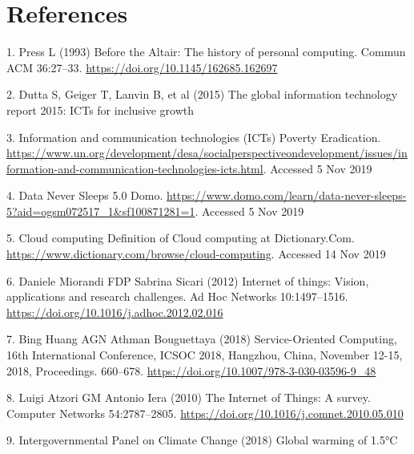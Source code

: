 \documentclass[11pt,]{article}
\begin{document}
\hypertarget{references}{%
\section*{References}\label{references}}

\hypertarget{refs}{}
\leavevmode\hypertarget{ref-pressAltairHistoryPersonal1993}{}%
1. Press L (1993) Before the Altair: The history of personal computing.
Commun ACM 36:27--33. \url{https://doi.org/10.1145/162685.162697}

\leavevmode\hypertarget{ref-duttaGlobalInformationTechnology2015}{}%
2. Dutta S, Geiger T, Lanvin B, et al (2015) The global information
technology report 2015: ICTs for inclusive growth

\leavevmode\hypertarget{ref-InformationCommunicationTechnologies}{}%
3. Information and communication technologies (ICTs) \textbar{} Poverty
Eradication.
\url{https://www.un.org/development/desa/socialperspectiveondevelopment/issues/information-and-communication-technologies-icts.html}.
Accessed 5 Nov 2019

\leavevmode\hypertarget{ref-DataNeverSleeps}{}%
4. Data Never Sleeps 5.0 \textbar{} Domo.
\url{https://www.domo.com/learn/data-never-sleeps-5?aid=ogsm072517_1\&sf100871281=1}.
Accessed 5 Nov 2019

\leavevmode\hypertarget{ref-CloudComputingDefinition}{}%
5. Cloud computing \textbar{} Definition of Cloud computing at
Dictionary.Com. \url{https://www.dictionary.com/browse/cloud-computing}.
Accessed 14 Nov 2019

\leavevmode\hypertarget{ref-danielemiorandiInternetThingsVision2012}{}%
6. Daniele Miorandi FDP Sabrina Sicari (2012) Internet of things:
Vision, applications and research challenges. Ad Hoc Networks
10:1497--1516. \url{https://doi.org/10.1016/j.adhoc.2012.02.016}

\leavevmode\hypertarget{ref-binghuangServiceOrientedComputing16th2018}{}%
7. Bing Huang AGN Athman Bouguettaya (2018) Service-Oriented Computing,
16th International Conference, ICSOC 2018, Hangzhou, China, November
12-15, 2018, Proceedings. 660--678.
\url{https://doi.org/10.1007/978-3-030-03596-9_48}

\leavevmode\hypertarget{ref-luigiatzoriInternetThingsSurvey2010}{}%
8. Luigi Atzori GM Antonio Iera (2010) The Internet of Things: A survey.
Computer Networks 54:2787--2805.
\url{https://doi.org/10.1016/j.comnet.2010.05.010}

\leavevmode\hypertarget{ref-intergovernmentalpanelonclimatechangeGlobalWarming2018}{}%
9. Intergovernmental Panel on Climate Change (2018) Global warming of
1.5°C
\end{document}
